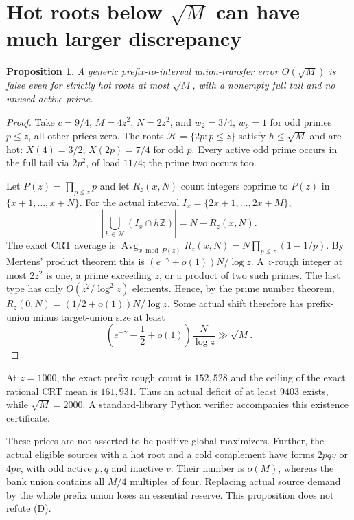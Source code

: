 \documentclass[11pt]{article}
\newtheorem{proposition}{Proposition}
\begin{document}
\section{Hot roots below $\sqrt M$ can have much larger discrepancy}
\begin{proposition}
A generic prefix-to-interval union-transfer error $O(\sqrt M)$ is false
even for strictly hot roots at most $\sqrt M$, with a nonempty full tail
and no unused active prime.
\end{proposition}
\begin{proof}
Take $c=9/4$, $M=4z^2$, $N=2z^2$, and
$w_2=3/4$, $w_p=1$ for odd primes $p\le z$, all other prices zero.
The roots $\mathcal H=\{2p:p\le z\}$ satisfy $h\le\sqrt M$ and are hot:
$X(4)=3/2$, $X(2p)=7/4$ for odd $p$.
Every active odd prime occurs in the full tail via $2p^2$, of load $11/4$;
the prime two occurs too.

Let $P(z)=\prod_{p\le z}p$ and let $R_z(x,N)$ count integers coprime to
$P(z)$ in $\{x+1,\ldots,x+N\}$. For the actual interval
$I_x=\{2x+1,\ldots,2x+M\}$,
\[
 \left|\bigcup_{h\in\mathcal H}(I_x\cap h\mathbb Z)\right|=N-R_z(x,N).
\]
The exact CRT average is
$\operatorname{Avg}_{x\bmod P(z)}R_z(x,N)=N\prod_{p\le z}(1-1/p)$.
By Mertens' product theorem this is
$(e^{-\gamma}+o(1))N/\log z$.
A $z$-rough integer at most $2z^2$ is one, a prime exceeding $z$, or a
product of two such primes. The last type has only
$O(z^2/\log^2z)$ elements. Hence, by the prime number theorem,
$R_z(0,N)=(1/2+o(1))N/\log z$.
Some actual shift therefore has prefix-union minus target-union size
at least
\[
 \left(e^{-\gamma}-\frac12+o(1)\right)\frac N{\log z}\gg\sqrt M.\tag{4}
\]
\end{proof}
At $z=1000$, the exact prefix rough count is $152{,}528$ and the ceiling
of the exact rational CRT mean is $161{,}931$. Thus an actual deficit
of at least $9403$ exists, while $\sqrt M=2000$. A standard-library
Python verifier accompanies this existence certificate.

These prices are not asserted to be positive global maximizers. Further,
the actual eligible sources with a hot root and a cold complement have
forms $2pqv$ or $4pv$, with odd active $p,q$ and inactive $v$. Their
number is $o(M)$, whereas the bank union contains all $M/4$ multiples
of four. Replacing actual source demand by the whole prefix union loses
an essential reserve. This proposition does not refute (D).
\end{document}
